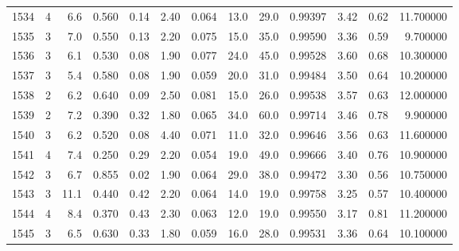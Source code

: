 \begin{tabular}{lrrrrrrrrrrrr}
1534 &        4 &            6.6 &             0.560 &         0.14 &            2.40 &      0.064 &                 13.0 &                  29.0 &  0.99397 &  3.42 &       0.62 &  11.700000 \\
1535 &        3 &            7.0 &             0.550 &         0.13 &            2.20 &      0.075 &                 15.0 &                  35.0 &  0.99590 &  3.36 &       0.59 &   9.700000 \\
1536 &        3 &            6.1 &             0.530 &         0.08 &            1.90 &      0.077 &                 24.0 &                  45.0 &  0.99528 &  3.60 &       0.68 &  10.300000 \\
1537 &        3 &            5.4 &             0.580 &         0.08 &            1.90 &      0.059 &                 20.0 &                  31.0 &  0.99484 &  3.50 &       0.64 &  10.200000 \\
1538 &        2 &            6.2 &             0.640 &         0.09 &            2.50 &      0.081 &                 15.0 &                  26.0 &  0.99538 &  3.57 &       0.63 &  12.000000 \\
1539 &        2 &            7.2 &             0.390 &         0.32 &            1.80 &      0.065 &                 34.0 &                  60.0 &  0.99714 &  3.46 &       0.78 &   9.900000 \\
1540 &        3 &            6.2 &             0.520 &         0.08 &            4.40 &      0.071 &                 11.0 &                  32.0 &  0.99646 &  3.56 &       0.63 &  11.600000 \\
1541 &        4 &            7.4 &             0.250 &         0.29 &            2.20 &      0.054 &                 19.0 &                  49.0 &  0.99666 &  3.40 &       0.76 &  10.900000 \\
1542 &        3 &            6.7 &             0.855 &         0.02 &            1.90 &      0.064 &                 29.0 &                  38.0 &  0.99472 &  3.30 &       0.56 &  10.750000 \\
1543 &        3 &           11.1 &             0.440 &         0.42 &            2.20 &      0.064 &                 14.0 &                  19.0 &  0.99758 &  3.25 &       0.57 &  10.400000 \\
1544 &        4 &            8.4 &             0.370 &         0.43 &            2.30 &      0.063 &                 12.0 &                  19.0 &  0.99550 &  3.17 &       0.81 &  11.200000 \\
1545 &        3 &            6.5 &             0.630 &         0.33 &            1.80 &      0.059 &                 16.0 &                  28.0 &  0.99531 &  3.36 &       0.64 &  10.100000 \\

\end{tabular}
